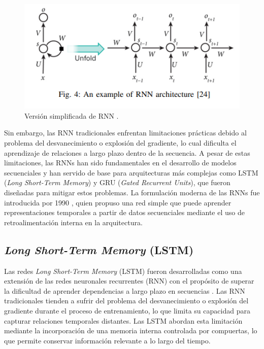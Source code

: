 \begin{figure}[h!] 
    \includegraphics[width=1\textwidth]{images/RNN.png} 
    \centering 
    \caption[Versión simplificada de RNN.]
    {Versión simplificada de RNN \protect \cite{Aslam2019}.}
    \label{image:RNN} 
\end{figure}

Sin embargo, las RNN tradicionales enfrentan limitaciones 
prácticas debido al problema del desvanecimiento o explosión 
del gradiente, lo cual dificulta el aprendizaje de relaciones 
a largo plazo dentro de la secuencia. A pesar de estas 
limitaciones, las RNNs han sido fundamentales en el 
desarrollo de modelos secuenciales y han servido de base para 
arquitecturas más complejas como LSTM (\textit{Long Short-Term Memory}) 
y GRU (\textit{Gated Recurrent Units}), que fueron diseñadas para 
mitigar estos problemas. La formulación moderna de las RNNs 
fue introducida por 1990 \cite{elman1990finding}, 
quien propuso una red simple que puede aprender 
representaciones temporales a partir de datos secuenciales 
mediante el uso de retroalimentación interna en la 
arquitectura.

\subsection{\textit{Long Short-Term Memory} (LSTM)}\label{lstm}

Las redes \textit{Long Short-Term Memory} (LSTM) fueron 
desarrolladas como una extensión de las redes neuronales 
recurrentes (RNN) con el propósito de superar la dificultad 
de aprender dependencias a largo plazo en secuencias
 \cite{hochreiter1997lstm}. Las 
RNN tradicionales tienden a sufrir del problema del 
desvanecimiento o explosión del gradiente durante el 
proceso de entrenamiento, lo que limita su capacidad 
para capturar relaciones temporales distantes. Las LSTM 
abordan esta limitación mediante la incorporación de una 
memoria interna controlada por compuertas, lo que permite 
conservar información relevante a lo largo del tiempo.\\

